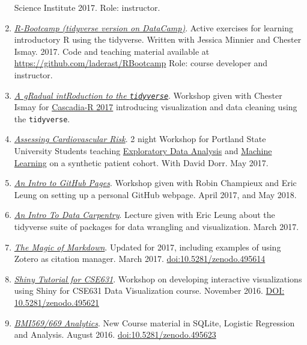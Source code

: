 \documentclass[11pt,]{article}
\begin{document}
\begin{enumerate}
  Science Institute 2017. Role: instructor.
\item
  \href{https://www.datacamp.com/courses/rbootcamp}{\emph{R-Bootcamp
  (tidyverse version on DataCamp)}}. Active exercises for learning
  introductory R using the tidyverse. Written with Jessica Minnier and
  Chester Ismay. 2017. Code and teaching material available at
  \url{https://github.com/laderast/RBootcamp} Role: course developer and
  instructor.
\item
  \href{https://github.com/Cascadia-R/gRadual-intRoduction-tidyverse}{\emph{A
  gRadual intRoduction to the \texttt{tidyverse}}}. Workshop given with
  Chester Ismay for \href{https://cascadiarconf.com}{Cascadia-R 2017}
  introducing visualization and data cleaning using the
  \texttt{tidyverse}.
\item
  \href{https://github.com/laderast/cvdNight1}{\emph{Assessing
  Cardiovascular Risk}}. 2 night Workshop for Portland State University
  Students teaching
  \href{https://github.com/laderast/cvdNight1}{Exploratory Data
  Analysis} and \href{https://github.com/laderast/cvdNight2}{Machine
  Learning} on a synthetic patient cohort. With David Dorr. May 2017.
\item
  \href{https://github.com/biodata-club/githubPagesTutorial}{\emph{An
  Intro to GitHub Pages}}. Workshop given with Robin Champieux and Eric
  Leung on setting up a personal GitHub webpage. April 2017, and May
  2018.
\item
  \href{https://github.com/erictleung/tutorial-tidyverse}{\emph{An Intro
  To Data Carpentry}}. Lecture given with Eric Leung about the tidyverse
  suite of packages for data wrangling and visualization. March 2017.
\item
  \href{https://github.com/laderast/magic-of-markdown}{\emph{The Magic
  of Markdown}}. Updated for 2017, including examples of using Zotero as
  citation manager. March 2017.
  \href{https://doi.org/10.5281/zenodo.495614}{doi:10.5281/zenodo.495614}
\item
  \href{https://github.com/laderast/CSE631Shiny}{\emph{Shiny Tutorial
  for CSE631}}. Workshop on developing interactive visualizations using
  Shiny for CSE631 Data Visualization course. November 2016.
  \href{https://doi.org/10.5281/zenodo.495621}{DOI:
  10.5281/zenodo.495621}
\item
  \href{https://github.com/laderast/AnalyticsCourse}{\emph{BMI569/669
  Analytics}}. New Course material in SQLite, Logistic Regression and
  Analysis. August 2016.
  \href{https://doi.org/10.5281/zenodo.495623}{doi:10.5281/zenodo.495623}

\end{enumerate}
\end{document}
